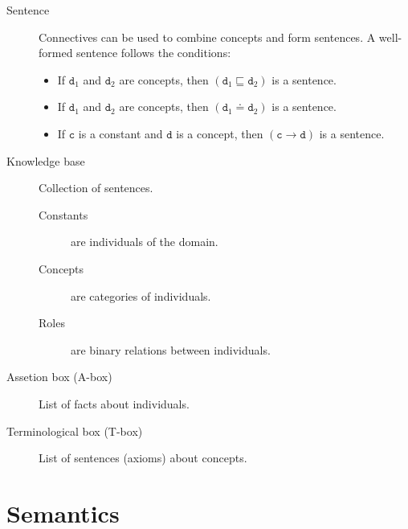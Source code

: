 \begin{description}
    \item[Sentence] 
        Connectives can be used to combine concepts and form sentences.
        A well-formed sentence follows the conditions:
        \begin{itemize}
            \item If $\texttt{d}_1$ and $\texttt{d}_2$ are concepts, 
                then $(\texttt{d}_1 \sqsubseteq \texttt{d}_2)$ is a sentence.
            \item If $\texttt{d}_1$ and $\texttt{d}_2$ are concepts, 
                then $(\texttt{d}_1 \doteq \texttt{d}_2)$ is a sentence.
            \item If $\texttt{c}$ is a constant and $\texttt{d}$ is a concept,
                then $(\texttt{c} \rightarrow \texttt{d})$ is a sentence.
        \end{itemize}

    \item[Knowledge base] 
        Collection of sentences.
        \begin{description}
            \item[Constants] are individuals of the domain.
            \item[Concepts] are categories of individuals.
            \item[Roles] are binary relations between individuals.
        \end{description}


    \item[Assetion box (A-box)] 
        List of facts about individuals.

    \item[Terminological box (T-box)] 
        List of sentences (axioms) about concepts.
\end{description}



\section{Semantics}

